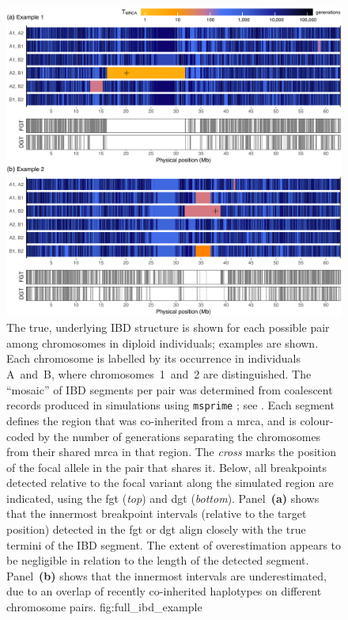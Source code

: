 

\begin{figure}[!htbp]
\includegraphics[width=\textwidth]{./img/ch3/full_ibd_example_reduced}
{The true, underlying IBD structure is shown for each possible pair among  chromosomes in  diploid individuals;  examples are shown.
Each chromosome is labelled by its occurrence in individuals A~and~B, where chromosomes~1~and~2 are distinguished.
The ``mosaic'' of IBD segments per pair was determined from coalescent records produced in simulations using \texttt{msprime} \citep{Kelleher:2016fn}; see .
Each segment defines the region that was co-inherited from a \gls{mrca}, and is colour-coded by the number of generations separating the  chromosomes from their shared \gls{mrca} in that region.
The \emph{cross} marks the position of the focal allele in the pair that shares it.
Below, all breakpoints detected relative to the focal variant along the simulated region are indicated, using the \gls{fgt} (\emph{top}) and \gls{dgt} (\emph{bottom}).
Panel~\textbf{(a)} shows that the innermost breakpoint intervals (relative to the target position) detected in the \gls{fgt} or \gls{dgt} align closely with the true termini of the IBD segment.
The extent of overestimation appears to be negligible in relation to the length of the detected segment.
Panel~\textbf{(b)} shows that the innermost intervals are underestimated, due to an overlap of recently co-inherited haplotypes on different chromosome pairs.}
{fig:full_ibd_example}
\end{figure}

